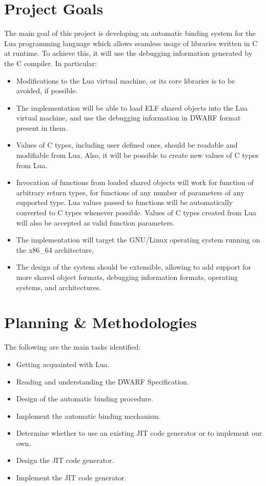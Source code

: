 \section{Project Goals}

The main goal of this project is developing an automatic binding system for
the Lua programming language which allows seamless usage of libraries written
in C at runtime. To achieve this, it will use the debugging information
generated by the C compiler. In particular:

\begin{itemize}
	\item Modifications to the Lua virtual machine, or its core libraries is
		to be avoided, if possible.
	\item The implementation will be able to load \gls{ELF} shared objects
		into the Lua virtual machine, and use the debugging information in
		\gls{DWARF} format present in them.
	\item Values of C types, including user defined ones, should be readable
		and modifiable from Lua. Also, it will be possible to create new
		values of C types from Lua.
	\item Invocation of functions from loaded shared objects will work for
		function of arbitrary return types, for functions of any number of
		parameters of any supported type. Lua values passed to functions
		will be automatically converted to C types whenever possible. Values
		of C types created from Lua will also be accepted as valid function
		parameters.
	\item The implementation will target the GNU/Linux operating system
		running on the {x86\_64} architecture,
	\item The design of the system should be extensible, allowing to add
		support for more shared object formats, debugging information formats,
		operating systems, and architectures.
\end{itemize}


\section{Planning \& Methodologies}

The following are the main tasks identified:

\begin{itemize}
	\item Getting acquainted with Lua.
	\item Reading and understanding the \gls{DWARF} Specification.
	\item Design of the automatic binding procedure.
	\item Implement the automatic binding mechanism.
	\item Determine whether to use an existing JIT code generator or to
		implement our own.
	\item Design the JIT code generator.
	\item Implement the JIT code generator.
\end{itemize}
